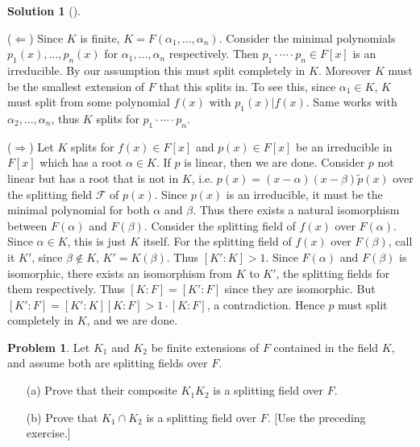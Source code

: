 \documentclass{article}
\theoremstyle{definition}
\newtheorem{prob}{Problem}
\newtheorem*{sol}{Solution}
\newenvironment{sols}[1][]{%
  \begin{sol}[#1]$ $\par\nobreak\ignorespaces
}{%
  \end{sol}
}
\begin{document}
\begin{sols}
	($\Leftarrow$) Since $K$ is finite, $K = F(\alpha_1, ..., \alpha_n)$.
	Consider the minimal polynomials $p_1(x), ..., p_n(x)$ for $\alpha_1, ..., \alpha_n$ respectively.
	Then $p_1 \cdot \cdots \cdot p_n \in F[x]$ is an irreducible.
	By our assumption this must split completely in $K$.
	Moreover $K$ must be the smallest extension of $F$ that this splits in.
	To see this, since $\alpha_1 \in K$, $K$ must split from some polynomial $f(x)$ with $p_1(x)|f(x)$.
	Same works with $\alpha_2, ..., \alpha_n$, thus $K$ splits for $p_1 \cdot \cdots \cdot p_n$.

	\par ($\Rightarrow$) Let $K$ splits for $f(x) \in F[x]$ and $p(x) \in F[x]$ be an irreducible in $F[x]$ which has a root $\alpha \in K$.
	If $p$ is linear, then we are done.
	Consider $p$ not linear but has a root that is not in $K$, i.e. $p(x) = (x - \alpha) (x - \beta) \tilde{p}(x)$ over the splitting field $\mathcal{F}$ of $p(x)$.
	Since $p(x)$ is an irreducible, it must be the minimal polynomial for both $\alpha$ and $\beta$. 
	Thus there exists a natural isomorphism between $F(\alpha)$ and $F(\beta)$.
	Consider the splitting field of $f(x)$ over $F(\alpha)$.
	Since $\alpha \in K$, this is just $K$ itself.
	For the splitting field of $f(x)$ over $F(\beta)$, call it $K'$, since $\beta \notin K$, $K' = K(\beta)$.
	Thus $[K':K] > 1$.
	Since $F(\alpha)$ and $F(\beta)$ is isomorphic, there exists an isomorphism from $K$ to $K'$, the splitting fields for them respectively.
	Thus $[K:F] = [K':F]$ since they are isomorphic.
	But $[K':F] = [K':K][K:F] > 1 \cdot [K:F]$, a contradiction.
	Hence $p$ must split completely in $K$, and we are done.
\end{sols}

\begin{prob}
	Let $K_1$ and $K_2$ be finite extensions of $F$ contained in the field $K$, and assume both are splitting fields over $F$.
	\begin{enumerate}
		\item[(a)] Prove that their composite $K_1 K_2$ is a splitting field over $F$.

		\item[(b)] Prove that $K_1 \cap K_2$ is a splitting field over $F$.
			[Use the preceding exercise.]
	\end{enumerate}
\end{prob}
\end{document}
